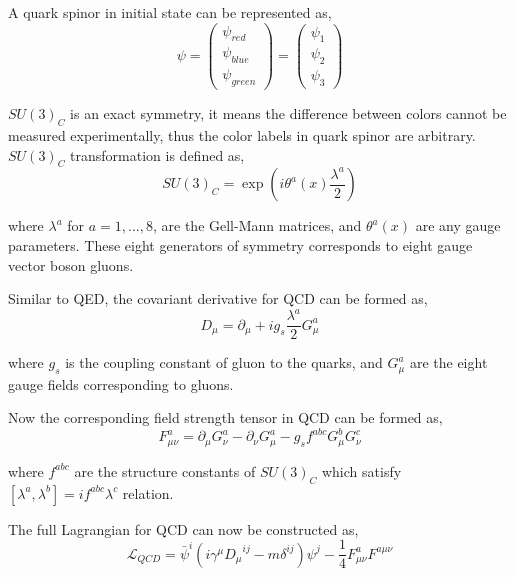 A quark spinor in initial state can be represented as,
%
\begin{equation}
  \psi = \left( \begin{matrix}
    \psi_{red}  \\
    \psi_{blue} \\
    \psi_{green}
  \end{matrix} \right)
  = \left( \begin{matrix}
    \psi_{1} \\
    \psi_{2} \\
    \psi_{3}
  \end{matrix} \right)
\end{equation}

\( {SU(3)}_{C} \) is an exact symmetry, it means the difference between
colors cannot be measured experimentally, thus the color labels in quark spinor are arbitrary.
\( {SU(3)}_{C} \) transformation is defined as,
%
\begin{equation}
  {SU(3)}_{C} = \exp \left( {i \theta^{a}(x) \frac{\lambda^{a}}{2}} \right)
\end{equation}

where \( \lambda^{a} \) for \( a = 1,\ldots,8\),
are the Gell-Mann matrices, and \( \theta^{a}(x) \) are any gauge parameters.
These eight generators of symmetry corresponds to eight gauge vector boson gluons.

Similar to \gls{QED}, the covariant derivative for \gls{QCD} can be formed as,
%
\begin{equation}
  D_{\mu} = \partial_{\mu} + i g_s \frac{\lambda^{a}}{2} G_{\mu}^{a}
\end{equation}

where \( g_s \) is the coupling constant of gluon to the quarks,
and \( G_{\mu}^{a} \) are the eight gauge fields corresponding to gluons.

Now the corresponding field strength tensor in \gls{QCD} can be formed as,
%
\begin{equation}
  F_{\mu \nu}^{a} = \partial_{\mu} G_{\nu}^{a} - \partial_{\nu} G_{\mu}^{a}
  - g_s f^{abc} G_{\mu}^{b} G_{\nu}^{c}
\end{equation}

where \( f^{abc} \) are the structure constants of \( {SU(3)}_{C} \)
which satisfy \( [\lambda^{a}, \lambda^{b}] = i f^{abc} \lambda^{c} \) relation.

The full Lagrangian for \gls{QCD} can now be constructed as,
%
\begin{equation}
  {\mathcal{L}}_{QCD} = {\bar{\psi}}^{i}
  ( i {\gamma}^{\mu} {{D}_{\mu}}^{ij} - m \delta^{ij} )\psi^{j}
  - \frac{1}{4} {F}_{\mu \nu}^{a} {F}^{a \mu \nu}
\end{equation}

